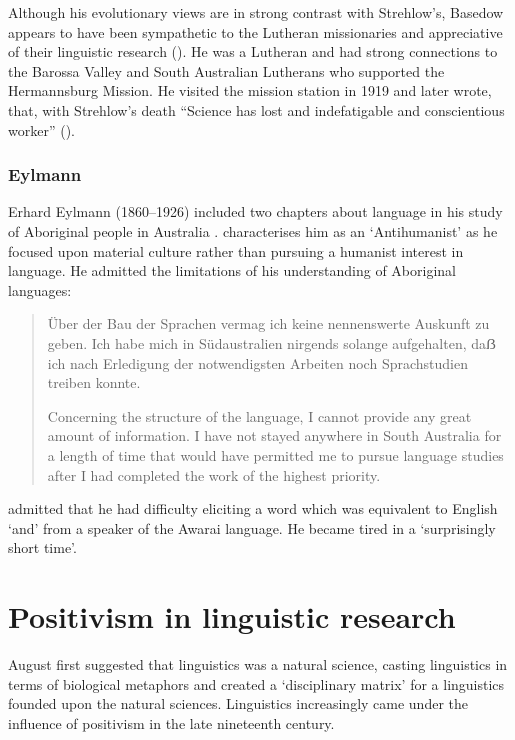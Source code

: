 \documentclass[output=paper]{langsci/langscibook}
\begin{document}
Although his evolutionary views are in strong contrast with Strehlow’s, Basedow appears to have been sympathetic to the Lutheran missionaries and appreciative of their linguistic research (\citealt[vi]{harmstorf_introduction_2004}). He was a Lutheran and had strong connections to the Barossa Valley and South Australian Lutherans who supported the Hermannsburg Mission. He visited the mission station in 1919 and later wrote, that, with Strehlow’s death “Science has lost and indefatigable and conscientious worker” (\citealt[ix]{basedow_australian_1925}). 

\subsubsection{Eylmann}

Erhard Eylmann (1860--1926) included two chapters about language in his study of Aboriginal people in Australia \citep{eylmann_eingeborenen_1908}. \citet[34]{monteath_globalising_2013} characterises him as an ‘Antihumanist’ as he focused upon material culture rather than pursuing a humanist interest in language. He admitted the limitations of his understanding of Aboriginal languages:

\begin{quote}
    Über der Bau der Sprachen vermag ich keine nennenswerte Auskunft zu geben. Ich habe mich in Südaustralien nirgends solange aufgehalten, da\textlatin{ẞ} ich nach Erledigung der notwendigsten Arbeiten noch Sprachstudien treiben konnte. 

    Concerning the structure of the language, I cannot provide any great amount of information. I have not stayed anywhere in South Australia for a length of time that would have permitted me to pursue language studies after I had completed the work of the highest priority. \citep[81]{eylmann_eingeborenen_1908}
\end{quote}

\citet[81]{eylmann_eingeborenen_1908} admitted that he had difficulty eliciting a word which was equivalent to English ‘and’ from a speaker of the Awarai language. He became tired in a ‘surprisingly short time’.

\section{Positivism in linguistic research}

August \citet{schleicher_sprachen_1983}  first suggested that linguistics was a natural science, casting linguistics in terms of biological metaphors and created a ‘disciplinary matrix’ for a linguistics founded upon the natural sciences. Linguistics increasingly came under the influence of positivism in the late nineteenth century.
\end{document}
